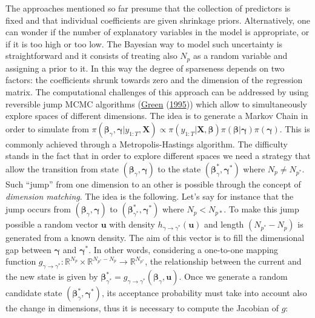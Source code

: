 \documentclass[
  12pt,
]{book}
\theoremstyle{break}
\theoremstyle{nonumberplain}
\begin{document}
The approaches mentioned so far presume that the collection of
predictors is fixed and that individual coefficients are given shrinkage
priors. Alternatively, one can wonder if the number of explanatory
variables in the model is appropriate, or if it is too high or too low.
The Bayesian way to model such uncertainty is straightforward and it
consists of treating also \(N_{p}\) as a random variable and assigning a
prior to it. In this way the degree of sparseness depends on two
factors: the coefficients shrunk towards zero and the dimension of the
regression matrix. The computational challenges of this approach can be
addressed by using reversible jump MCMC algorithms
(\protect\hyperlink{ref-G_1995}{Green}
(\protect\hyperlink{ref-G_1995}{1995})) which allow to simultaneously
explore spaces of different dimensions. The idea is to generate a Markov
Chain in order to simulate from
\(\pi(\boldsymbol{\beta}_{\gamma},\boldsymbol{\gamma}|y_{1:T},\boldsymbol{X})\propto\pi(y_{1:T}|\boldsymbol{X},\boldsymbol{\beta})\pi(\boldsymbol{\beta}|\boldsymbol{\gamma})\pi(\boldsymbol{\gamma})\).
This is commonly achieved through a Metropolis-Hastings algorithm. The
difficulty stands in the fact that in order to explore different spaces
we need a strategy that allow the transition from state
\((\boldsymbol{\beta}_{\gamma},\boldsymbol{\gamma})\) to the state
\((\boldsymbol{\beta}_{\gamma}^{*},\boldsymbol{\gamma}^{*})\) where
\(N_{p} \neq N_{p^*}\). Such ``jump'' from one dimension to an other is
possible through the concept of \emph{dimension matching}. The idea is
the following. Let's say for instance that the jump occurs from
\((\boldsymbol{\beta}_{\gamma},\boldsymbol{\gamma})\) to
\((\boldsymbol{\beta}_{\gamma^{*}}^{*},\boldsymbol{\gamma}^{*})\) where
\(N_{p}<N_{p*}\). To make this jump possible a random vector
\(\boldsymbol{u}\) with density
\(h_{\gamma \to \gamma^*}(\boldsymbol{u})\) and length
\((N_{p^*}-N_{p})\) is generated from a known density. The aim of this
vector is to fill the dimensional gap between \(\boldsymbol{\gamma}\)
and \(\boldsymbol{\gamma}^{*}\). In other words, considering a
one-to-one mapping function
\(g_{\gamma \to \gamma^*}:\mathbb{R}^{N_{p}}\times\mathbb{R}^{N_{p^*}-N_{p}}\to\mathbb{R}^{N_{p^*}}\),
the relationship between the current and the new state is given by
\(\boldsymbol{\beta}^{*}_{\gamma^{*}}=g_{\gamma \to \gamma^*}(\boldsymbol{\beta}_{\gamma},\boldsymbol{u})\).
Once we generate a random candidate state
\((\boldsymbol{\beta}_{\gamma}^{*},\boldsymbol{\gamma}^{*})\), its
acceptance probability must take into account also the change in
dimensions, thus it is necessary to compute the Jacobian of \(g\):
\end{document}
